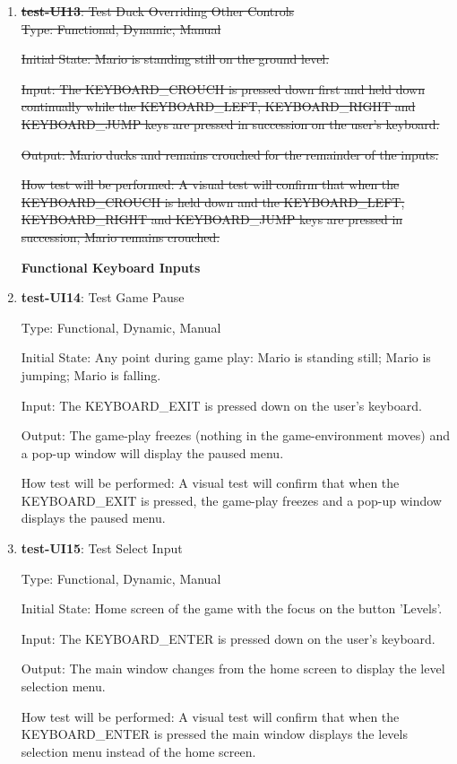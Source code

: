 \documentclass[12pt, titlepage]{article}
\begin{document}
\begin{enumerate}
\item{}
\sout{\textbf{test-UI13}: Test Duck Overriding Other Controls}\\

\sout{Type: Functional, Dynamic, Manual}

\sout{Initial State: Mario is standing still on the ground level.}

\sout{Input: The KEYBOARD\_CROUCH is pressed down first and held down continually while the KEYBOARD\_LEFT, KEYBOARD\_RIGHT and KEYBOARD\_JUMP keys are pressed in succession on the user's keyboard.}

\sout{Output: Mario ducks and remains crouched for the remainder of the inputs.}

\sout{How test will be performed: A visual test will confirm that when the KEYBOARD\_CROUCH is held down and the KEYBOARD\_LEFT, KEYBOARD\_RIGHT and KEYBOARD\_JUMP keys are pressed in succession, Mario remains crouched.}

\textbf{Functional Keyboard Inputs}

\item{\textbf{test-UI14}: Test Game Pause\\}

Type: Functional, Dynamic, Manual

Initial State: Any point during game play: Mario is standing still; Mario is jumping; Mario is falling.

Input: The KEYBOARD\_EXIT is pressed down on the user's keyboard.

Output: The game-play freezes (nothing in the game-environment moves) and a pop-up window will display the paused menu.

How test will be performed: A visual test will confirm that when the KEYBOARD\_EXIT is pressed, the game-play freezes and a pop-up window displays the paused menu.

\item{\textbf{test-UI15}: Test Select Input\\}

Type: Functional, Dynamic, Manual

Initial State: Home screen of the game with the focus on the button 'Levels'.

Input: The KEYBOARD\_ENTER is pressed down on the user's keyboard.

Output: The main window changes from the home screen to display the level selection menu.

How test will be performed: A visual test will confirm that when the KEYBOARD\_ENTER is pressed the main window displays the levels selection menu instead of the home screen.


\end{enumerate}
\end{document}
